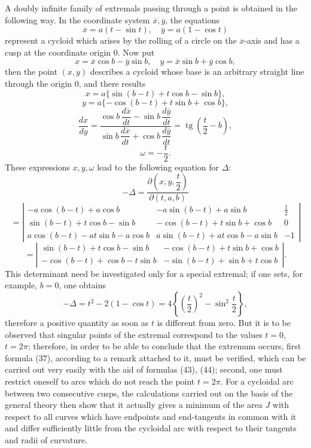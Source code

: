 \documentclass[11pt,a4paper,leqno]{article}
\newcommand{\tg}{\operatorname{tg}}
\begin{document}
A doubly infinite family of extremals passing through a point is obtained in the following way. In the coordinate system $\overline{x},\overline{y}$, the equations
\begin{equation}\tag{43}
\overline{x}=a(t-\sin t),\quad \overline{y}=a(1-\cos t)
\end{equation}
represent a cycloid which arises by the rolling of a circle on the $\overline{x}$-axis and has a cusp at the coordinate origin 0. Now put
\begin{equation}\tag{44}
x=\overline{x}\cos b-\overline{y}\sin b,\quad
y=\overline{x}\sin b+\overline{y}\cos b,
\end{equation}
then the point $(x,y)$ describes a cycloid whose base is an arbitrary straight line through the origin 0, and there results
\[
x=a\{\sin(b-t)+t\cos b-\sin b\},
\]
\[
y=a\{-\cos(b-t)+t\sin b+\cos b\},
\]
\[
\frac{dx}{dy}=
\frac{\cos b\,\dfrac{d\overline{x}}{dt}-\sin b\,\dfrac{d\overline{y}}{dt}}
{\sin b\,\dfrac{d\overline{x}}{dt}+\cos b\,\dfrac{d\overline{y}}{dt}}
=\tg\left(\frac{t}{2}-b\right),
\]
\[
\omega=-\frac{t}{2}.
\]
These expressions $x,y,\omega$ lead to the following equation for $\Delta$:
\[
-\Delta=
\frac{\partial\left(x,y,\dfrac{t}{2}\right)}{\partial(t,a,b)}
\]
\[
=
\left|
\begin{array}{ccc}
-a\cos(b-t)+a\cos b & -a\sin(b-t)+a\sin b & \frac12\\
\sin(b-t)+t\cos b-\sin b & -\cos(b-t)+t\sin b+\cos b & 0\\
a\cos(b-t)-at\sin b-a\cos b & a\sin(b-t)+at\cos b-a\sin b & -1
\end{array}
\right|
\]
\[
=
\left|
\begin{array}{cc}
\sin(b-t)+t\cos b-\sin b & -\cos(b-t)+t\sin b+\cos b\\
-\cos(b-t)+\cos b-t\sin b & -\sin(b-t)+\sin b+t\cos b
\end{array}
\right|.
\]
This determinant need be investigated only for a special extremal; if one sets, for example, $b=0$, one obtains
\[
-\Delta=t^2-2(1-\cos t)=4\left\{\left(\frac{t}{2}\right)^2-\sin^2\frac{t}{2}\right\},
\]
therefore a positive quantity as soon as $t$ is different from zero. But it is to be observed that singular points of the extremal correspond to the values $t=0$, $t=2\pi$; therefore, in order to be able to conclude that the extremum occurs, first formula (37), according to a remark attached to it, must be verified, which can be carried out very easily with the aid of formulas (43), (44); second, one must restrict oneself to arcs which do not reach the point $t=2\pi$. For a cycloidal arc between two consecutive cusps, the calculations carried out on the basis of the general theory then show that it actually gives a minimum of the area $J$ with respect to all curves which have endpoints and end-tangents in common with it and differ sufficiently little from the cycloidal arc with respect to their tangents and radii of curvature.
\end{document}
